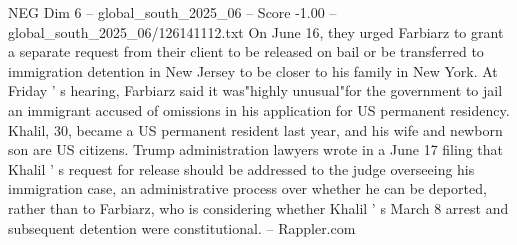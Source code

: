 \begin{textsample}{NEG Dim 6 – global\_south\_2025\_06 – Score -1.00 – global\_south\_2025\_06/126141112.txt}
On June 16, they urged Farbiarz to grant a separate request from their client to be released on bail or be transferred to immigration detention in New Jersey to be closer to his family in New York.
At Friday ' s hearing, Farbiarz said it was"highly unusual"for the government to jail an immigrant accused of omissions in his application for US permanent residency.
Khalil, 30, became a US permanent resident last year, and his wife and newborn son are US citizens.
Trump administration lawyers wrote in a June 17 filing that Khalil ' s request for release should be addressed to the judge overseeing his immigration case, an administrative process over whether he can be deported, rather than to Farbiarz, who is considering whether Khalil ' s March 8 arrest and subsequent detention were constitutional. -- Rappler.com

\end{textsample}

